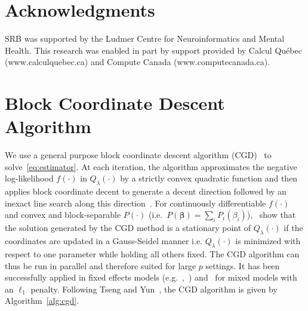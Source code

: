 \documentclass[12pt,letter]{article}\usepackage[]{graphicx}\usepackage[]{color}
\newcommand{\bbeta}{\boldsymbol{\beta}}
\begin{document}
\section*{Acknowledgments}

SRB was supported by the Ludmer Centre for Neuroinformatics and Mental Health. This research was enabled in part by support provided by Calcul Québec (www.calculquebec.ca) and Compute Canada (www.computecanada.ca).

%
%




\newpage

\appendix

\section{Block Coordinate Descent Algorithm} \label{ap:cgd}

We use a general purpose block coordinate descent algorithm (CGD)~\citep{tseng2009coordinate} to solve~\eqref{eq:estimator}. At each iteration, the algorithm approximates the negative log-likelihood $f(\cdot)$ in $Q_{\lambda}(\cdot)$ by a strictly convex quadratic function and then applies block coordinate decent to generate a decent direction followed by an inexact line search along this direction~\citep{tseng2009coordinate}. For continuously differentiable $f(\cdot)$ and convex and block-separable $P(\cdot)$ \mbox{(i.e. $P(\bbeta) = \sum_i P_i (\beta_i)$)},~\cite{tseng2009coordinate} show that the solution generated by the CGD method is a stationary point of $Q_{\lambda}(\cdot)$ if the coordinates are updated in a Gauss-Seidel manner i.e. $Q_{\lambda}(\cdot)$ is minimized with respect to one parameter while holding all others fixed. The CGD algorithm can thus be run in parallel and therefore suited for large $p$ settings. It has been successfully applied in fixed effects models (e.g.~\cite{meier2008group},~\cite{friedman2010regularization}) and~\cite{schelldorfer2011estimation} for mixed models with an $\ell_1$ penalty. Following Tseng and Yun~\cite{tseng2009coordinate}, the CGD algorithm is given by Algorithm~\ref{alg:cgd}.
\end{document}
